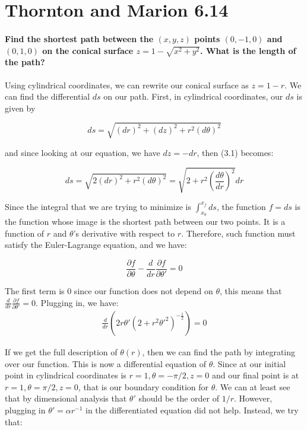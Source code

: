 \documentclass{article}
\numberwithin{equation}{section}
\begin{document}
\section{Thornton and Marion 6.14}

\paragraph{Find the shortest path between the $(x, y, z)$ points $(0, -1, 0)$ and $(0, 1, 0)$ on the conical surface $z = 1 - \sqrt{x^2 + y^2}$. What is the length of the path?\\}

Using cylindrical coordinates, we can rewrite our conical surface as $z = 1 - r$. We can find the differential $ds$ on our path. First, in cylindrical coordinates, our $ds$ is given by

\begin{equation}
    ds = \sqrt{(dr)^2 + (dz)^2 + r^2(d\theta)^2}
\end{equation}

and since looking at our equation, we have $dz = -dr$, then (3.1) becomes:

\begin{equation}
    ds = \sqrt{ 2(dr)^2 + r^2(d\theta)^2} = \sqrt{2 + r^2 (\frac{d\theta}{dr})^2} dr
\end{equation}
 
Since the integral that we are trying to minimize is $\int_{x_0}^{x_f} ds$, the function $f = ds$ is the function whose image is the shortest path between our two points. It is a function of $r$ and $\theta$'s derivative with respect to $r$. Therefore, such function must satisfy the Euler-Lagrange equation, and we have:

\begin{equation}
    \frac{\partial f }{\partial \theta} - \frac{d}{dr} \frac{\partial f}{\partial \theta'} = 0
\end{equation}

The first term is 0 since our function does not depend on $\theta$, this means that $\frac{d}{dr}\frac{\partial f}{\partial \theta'} = 0$. Plugging in, we have:
\begin{equation}
\begin{split}
    \frac{d}{dr}(2 r\theta' (2 + r^2 \theta'^2)^{-\frac{1}{2}}) = 0
    \end{split}
\end{equation}

If we get the full description of $\theta(r)$, then we can find the path by integrating over our function. This is now a differential equation of $\theta$. Since at our initial point in cylindrical coordinates is $r = 1, \theta = -\pi/2, z = 0$ and our final point is at $r = 1, \theta = \pi /2, z = 0$, that is our boundary condition for $\theta$. We can at least see that by dimensional analysis that $\theta'$ should be the order of $1/r$. However, plugging in $\theta' = \alpha r^{-1}$ in the differentiated equation did not help. Instead, we try that:
\end{document}

